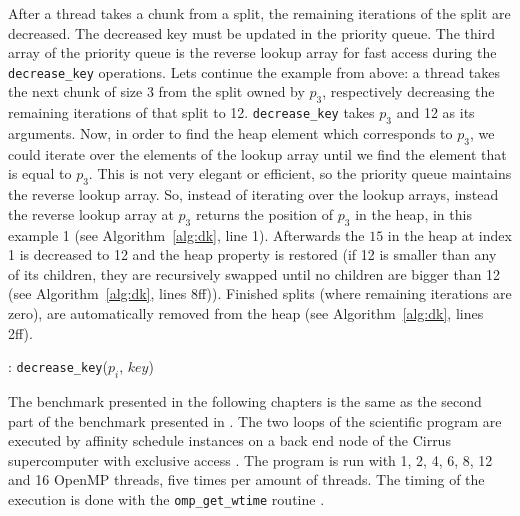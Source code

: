 \documentclass[twoside,11pt]{article}
\begin{document}
After a thread takes a chunk from a split, the remaining
iterations of the split are decreased.
The decreased key must be updated in the priority queue.
The third array of the priority queue is the reverse
lookup array for fast access during the
\texttt{decrease\_key} operations.
Lets continue the example from above: a thread takes the
next chunk of size 3 from the split owned by $p_3$,
respectively decreasing the remaining iterations of that
split to 12.
\texttt{decrease\_key} takes $p_3$ and 12 as its arguments.
Now, in order to find the heap element which corresponds
to $p_3$, we could iterate over the elements of the
lookup array until we find the element that is equal to
$p_3$.
This is not very elegant or efficient, so the priority
queue maintains the reverse lookup array.
So, instead of iterating over the lookup arrays, instead
the reverse lookup array at $p_3$ returns the position of
$p_3$ in the heap, in this example 1 (see
Algorithm~\ref{alg:dk}, line 1).
Afterwards the $15$ in the heap at index 1 is decreased to
12 and the heap property is restored (if 12 is smaller than
any of its children, they are recursively swapped until no
children are bigger than 12 (see Algorithm~\ref{alg:dk},
lines 8ff)).
Finished splits (where remaining iterations are zero),
are automatically removed from the heap (see
Algorithm~\ref{alg:dk}, lines 2ff).

\begin{algorithm}
  \caption{: \texttt{decrease\_key}($p_i$, $key$)}
  \label{alg:dk}

  \begin{algorithmic}[1]
    \ELSE
      \ENDWHILE
    \ENDIF
  \end{algorithmic}
\end{algorithm}

The benchmark presented in the following chapters is the
same as the second part of the benchmark presented in
\citet{b1}.
The two loops of the scientific program are executed by
affinity schedule instances on a back end node of the
Cirrus supercomputer with exclusive access
\citep[see][]{cirrus}.
The program is run with 1, 2, 4, 6, 8, 12 and 16 OpenMP
threads, five times per amount of threads.
The timing of the execution is done with the
\texttt{omp\_get\_wtime} routine
\citep[see][Chapter 3]{omp}.
\end{document}
